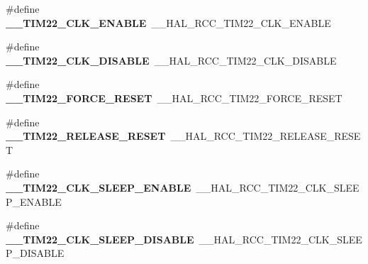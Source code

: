 \begin{DoxyCompactItemize}
\item 
\#define {\bfseries \+\_\+\+\_\+\+T\+I\+M22\+\_\+\+C\+L\+K\+\_\+\+E\+N\+A\+B\+LE}~\+\_\+\+\_\+\+H\+A\+L\+\_\+\+R\+C\+C\+\_\+\+T\+I\+M22\+\_\+\+C\+L\+K\+\_\+\+E\+N\+A\+B\+LE\hypertarget{group___h_a_l___r_c_c___aliased_ga1cb31ba98237a6cf0ef42a744cb85492}{}\label{group___h_a_l___r_c_c___aliased_ga1cb31ba98237a6cf0ef42a744cb85492}

\item 
\#define {\bfseries \+\_\+\+\_\+\+T\+I\+M22\+\_\+\+C\+L\+K\+\_\+\+D\+I\+S\+A\+B\+LE}~\+\_\+\+\_\+\+H\+A\+L\+\_\+\+R\+C\+C\+\_\+\+T\+I\+M22\+\_\+\+C\+L\+K\+\_\+\+D\+I\+S\+A\+B\+LE\hypertarget{group___h_a_l___r_c_c___aliased_ga866ebd9a0fc9021e63853457d20b24da}{}\label{group___h_a_l___r_c_c___aliased_ga866ebd9a0fc9021e63853457d20b24da}

\item 
\#define {\bfseries \+\_\+\+\_\+\+T\+I\+M22\+\_\+\+F\+O\+R\+C\+E\+\_\+\+R\+E\+S\+ET}~\+\_\+\+\_\+\+H\+A\+L\+\_\+\+R\+C\+C\+\_\+\+T\+I\+M22\+\_\+\+F\+O\+R\+C\+E\+\_\+\+R\+E\+S\+ET\hypertarget{group___h_a_l___r_c_c___aliased_ga3366750cb7794db4d1d46dd8d968038d}{}\label{group___h_a_l___r_c_c___aliased_ga3366750cb7794db4d1d46dd8d968038d}

\item 
\#define {\bfseries \+\_\+\+\_\+\+T\+I\+M22\+\_\+\+R\+E\+L\+E\+A\+S\+E\+\_\+\+R\+E\+S\+ET}~\+\_\+\+\_\+\+H\+A\+L\+\_\+\+R\+C\+C\+\_\+\+T\+I\+M22\+\_\+\+R\+E\+L\+E\+A\+S\+E\+\_\+\+R\+E\+S\+ET\hypertarget{group___h_a_l___r_c_c___aliased_ga1519bba7d69761e2198845ce7697a92b}{}\label{group___h_a_l___r_c_c___aliased_ga1519bba7d69761e2198845ce7697a92b}

\item 
\#define {\bfseries \+\_\+\+\_\+\+T\+I\+M22\+\_\+\+C\+L\+K\+\_\+\+S\+L\+E\+E\+P\+\_\+\+E\+N\+A\+B\+LE}~\+\_\+\+\_\+\+H\+A\+L\+\_\+\+R\+C\+C\+\_\+\+T\+I\+M22\+\_\+\+C\+L\+K\+\_\+\+S\+L\+E\+E\+P\+\_\+\+E\+N\+A\+B\+LE\hypertarget{group___h_a_l___r_c_c___aliased_ga97b8627f8f78a55d70a6c50241c43a2f}{}\label{group___h_a_l___r_c_c___aliased_ga97b8627f8f78a55d70a6c50241c43a2f}

\item 
\#define {\bfseries \+\_\+\+\_\+\+T\+I\+M22\+\_\+\+C\+L\+K\+\_\+\+S\+L\+E\+E\+P\+\_\+\+D\+I\+S\+A\+B\+LE}~\+\_\+\+\_\+\+H\+A\+L\+\_\+\+R\+C\+C\+\_\+\+T\+I\+M22\+\_\+\+C\+L\+K\+\_\+\+S\+L\+E\+E\+P\+\_\+\+D\+I\+S\+A\+B\+LE\hypertarget{group___h_a_l___r_c_c___aliased_gaa0747e8119f9798cffed35b6312a90ca}{}\label{group___h_a_l___r_c_c___aliased_gaa0747e8119f9798cffed35b6312a90ca}


\end{DoxyCompactItemize}
